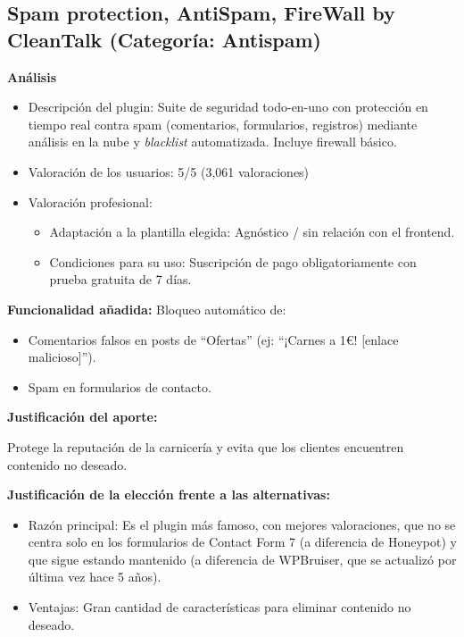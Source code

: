 \documentclass[a4paper]{article}
\begin{document}
\subsection{Spam protection, AntiSpam, FireWall by CleanTalk (Categoría: Antispam)}

\textbf{Análisis}
\begin{itemize}
    \item Descripción del plugin: Suite de seguridad todo-en-uno con protección en tiempo real contra spam (comentarios, formularios, registros) mediante análisis en la nube y \textit{blacklist} automatizada. Incluye firewall básico.
    \item Valoración de los usuarios: 5/5 (3,061 valoraciones)
    \item Valoración profesional:
    \begin{itemize}
        \item Adaptación a la plantilla elegida: Agnóstico / sin relación con el frontend.
        \item Condiciones para su uso: Suscripción de pago obligatoriamente con prueba gratuita de 7 días.
    \end{itemize}
\end{itemize}

\textbf{Funcionalidad añadida:} Bloqueo automático de:
\begin{itemize}
    \item Comentarios falsos en posts de ``Ofertas'' (ej: ``¡Carnes a 1€! [enlace malicioso]'').
    \item Spam en formularios de contacto.
\end{itemize}


\textbf{Justificación del aporte:} 

Protege la reputación de la carnicería y evita que los clientes encuentren contenido no deseado.


\textbf{Justificación de la elección frente a las alternativas:}
\begin{itemize}
    \item Razón principal: Es el plugin más famoso, con mejores valoraciones, que no se centra solo en los formularios de Contact Form 7 (a diferencia de Honeypot) y que sigue estando mantenido (a diferencia de WPBruiser, que se actualizó por última vez hace 5 años).
    \item Ventajas: Gran cantidad de características para eliminar contenido no deseado.
\end{itemize}
\end{document}
